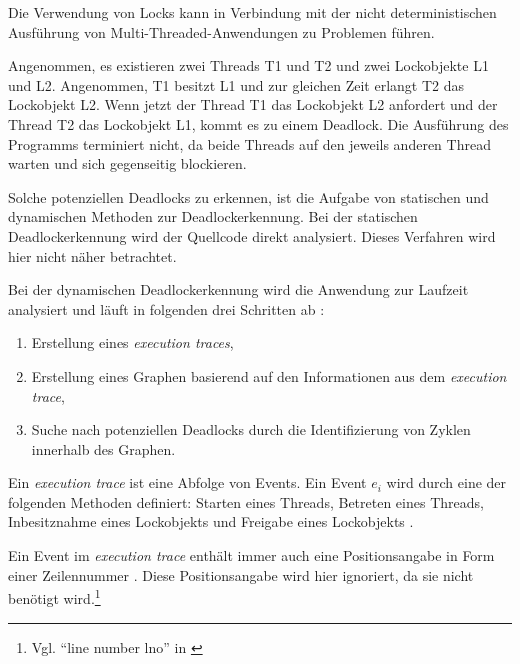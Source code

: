 Die Verwendung von Locks kann in Verbindung mit der nicht deterministischen
Ausführung von Multi-Threaded-Anwendungen zu Problemen führen.

Angenommen, es existieren zwei Threads \textrm{T1} und \textrm{T2} und zwei
Lockobjekte \textrm{L1} und \textrm{L2}. Angenommen, \textrm{T1} besitzt
\textrm{L1} und zur gleichen Zeit erlangt \textrm{T2} das Lockobjekt
\textrm{L2}. Wenn jetzt der Thread \textrm{T1} das Lockobjekt \textrm{L2}
anfordert und der Thread \textrm{T2} das Lockobjekt \textrm{L1}, kommt es zu
einem Deadlock.\autocite[vgl.][70]{coffman1971system} Die Ausführung des
Programms terminiert nicht, da beide Threads auf den jeweils anderen Thread
warten und sich gegenseitig blockieren.

Solche potenziellen Deadlocks zu erkennen, ist die Aufgabe von statischen und
dynamischen Methoden zur Deadlockerkennung. Bei der statischen Deadlockerkennung
wird der Quellcode direkt analysiert. Dieses Verfahren wird hier nicht näher
betrachtet.

Bei der dynamischen Deadlockerkennung wird die Anwendung zur Laufzeit analysiert
und läuft in folgenden drei Schritten ab
\autocite[vgl.][212-213]{bensalem2005dynamic}:
\begin{enumerate}
  \item Erstellung eines \emph{execution traces},
  \item Erstellung eines Graphen basierend auf den Informationen aus dem
  \emph{execution trace},
  \item Suche nach potenziellen Deadlocks durch die Identifizierung von Zyklen
  innerhalb des Graphen.
\end{enumerate}
Ein \emph{execution trace} ist eine Abfolge von Events. Ein Event \textrm{$e_i$}
wird durch eine der folgenden Methoden definiert: Starten eines Threads,
Betreten eines Threads, Inbesitznahme eines Lockobjekts und Freigabe eines
Lockobjekts \autocite[vgl.][212]{bensalem2005dynamic}.

Ein Event im \emph{execution trace} enthält immer auch eine Positionsangabe in
Form einer Zeilennummer \autocite[vgl.][212]{bensalem2005dynamic}. Diese
Positionsangabe  wird hier ignoriert, da sie nicht benötigt wird.\footnote{Vgl.
"`line number lno"' in \autocite[212]{bensalem2005dynamic}}

